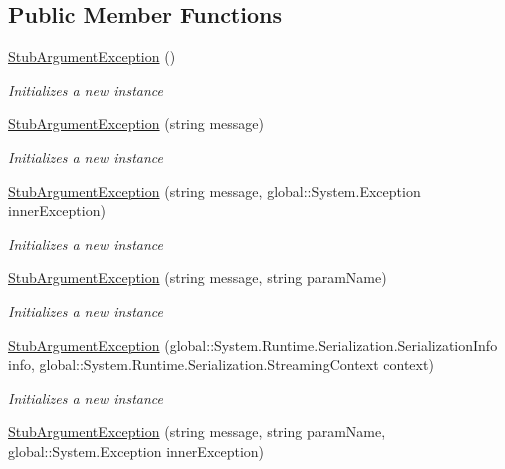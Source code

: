 \subsection*{Public Member Functions}
\begin{DoxyCompactItemize}
\item 
\hyperlink{class_system_1_1_fakes_1_1_stub_argument_exception_ac85bc76530d54251e7a72c2437a9bddb}{Stub\-Argument\-Exception} ()
\begin{DoxyCompactList}\small\item\em Initializes a new instance\end{DoxyCompactList}\item 
\hyperlink{class_system_1_1_fakes_1_1_stub_argument_exception_ad4594346ef2543e179c51fd2a3dd3a3a}{Stub\-Argument\-Exception} (string message)
\begin{DoxyCompactList}\small\item\em Initializes a new instance\end{DoxyCompactList}\item 
\hyperlink{class_system_1_1_fakes_1_1_stub_argument_exception_ab96bc0b9127ac56c800a48c6ddda0d4f}{Stub\-Argument\-Exception} (string message, global\-::\-System.\-Exception inner\-Exception)
\begin{DoxyCompactList}\small\item\em Initializes a new instance\end{DoxyCompactList}\item 
\hyperlink{class_system_1_1_fakes_1_1_stub_argument_exception_acf5e77181cdc004066d43b4ab59b724a}{Stub\-Argument\-Exception} (string message, string param\-Name)
\begin{DoxyCompactList}\small\item\em Initializes a new instance\end{DoxyCompactList}\item 
\hyperlink{class_system_1_1_fakes_1_1_stub_argument_exception_a77b32dd74e196a6cc324d3dfacaf0eda}{Stub\-Argument\-Exception} (global\-::\-System.\-Runtime.\-Serialization.\-Serialization\-Info info, global\-::\-System.\-Runtime.\-Serialization.\-Streaming\-Context context)
\begin{DoxyCompactList}\small\item\em Initializes a new instance\end{DoxyCompactList}\item 
\hyperlink{class_system_1_1_fakes_1_1_stub_argument_exception_a91b7a11d69217c42b268ac60f8fcc1be}{Stub\-Argument\-Exception} (string message, string param\-Name, global\-::\-System.\-Exception inner\-Exception)

\end{DoxyCompactItemize}
